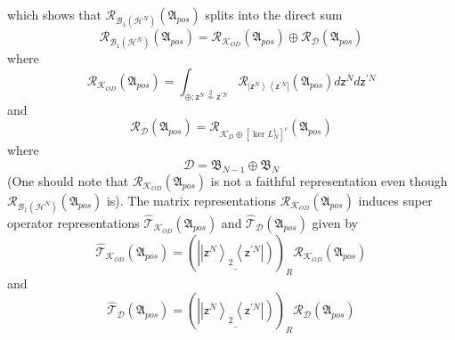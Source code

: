 \documentclass[aps,preprint]{revtex4}%
\begin{document}
which shows that $\mathcal{R}_{\mathcal{B}_{1}\left(  \mathcal{H}^{N}\right)
}\left(  \mathfrak{A}_{pos}\right)  $ splits into the direct sum
\begin{equation}
\mathcal{R}_{\mathcal{B}_{1}\left(  \mathcal{H}^{N}\right)  }\left(
\mathfrak{A}_{pos}\right)  =\mathcal{R}_{\mathcal{K}_{OD}}\left(
\mathfrak{A}_{pos}\right)  \oplus\mathcal{R}_{\mathcal{D}}\left(
\mathfrak{A}_{pos}\right)
\end{equation}
where
\begin{equation}
\mathcal{R}_{\mathcal{K}_{OD}}\left(  \mathfrak{A}_{pos}\right)  =\int
_{\oplus;\mathsf{z}^{N}\overset{2}{\nsim}\mathsf{z}^{\prime N}}\mathcal{R}%
_{\left\vert \mathsf{z}^{N}\right\rangle \left\langle \mathsf{z}^{\prime
N}\right\vert }\left(  \mathfrak{A}_{pos}\right)  d\mathsf{z}^{N}%
d\mathsf{z}^{\prime N}%
\end{equation}
and
\begin{equation}
\mathcal{R}_{\mathcal{D}}\left(  \mathfrak{A}_{pos}\right)  =\mathcal{R}%
_{\mathcal{K}_{D}\oplus\left[  \ker L_{N}^{1}\right]  ^{c}}\left(
\mathfrak{A}_{pos}\right)
\end{equation}
where
\begin{equation}
\mathcal{D}=\mathfrak{B}_{N-1}\oplus\mathfrak{B}_{N}%
\end{equation}
(One should note that $\mathcal{R}_{\mathcal{K}_{OD}}\left(  \mathfrak{A}%
_{pos}\right)  $ is not a faithful representation even though $\mathcal{R}%
_{\mathcal{B}_{1}\left(  \mathcal{H}^{N}\right)  }\left(  \mathfrak{A}%
_{pos}\right)  $ is). The matrix representations $\mathcal{R}_{\mathcal{K}%
_{OD}}\left(  \mathfrak{A}_{pos}\right)  $ induces super operator
representations $\mathcal{\hat{T}}_{\mathcal{K}_{OD}}\left(  \mathfrak{A}%
_{pos}\right)  $ and $\mathcal{\hat{T}}_{\mathcal{D}}\left(  \mathfrak{A}%
_{pos}\right)  $ given by
\begin{equation}
\mathcal{\hat{T}}_{\mathcal{K}_{OD}}\left(  \mathfrak{A}_{pos}\right)
=\left(  \underline{\left\vert \left\vert \mathsf{z}^{N}\right\rangle
_{2}\left\langle \mathsf{z}^{\prime N}\right\vert \right)  }\right)
_{R}\mathcal{R}_{\mathcal{K}_{OD}}\left(  \mathfrak{A}_{pos}\right)
\end{equation}
and
\begin{equation}
\mathcal{\hat{T}}_{\mathcal{D}}\left(  \mathfrak{A}_{pos}\right)  =\left(
\underline{\left\vert \left\vert \mathsf{z}^{N}\right\rangle _{2}\left\langle
\mathsf{z}^{\prime N}\right\vert \right)  }\right)  _{R}\mathcal{R}%
_{\mathcal{D}}\left(  \mathfrak{A}_{pos}\right)
\end{equation}
\end{document}

